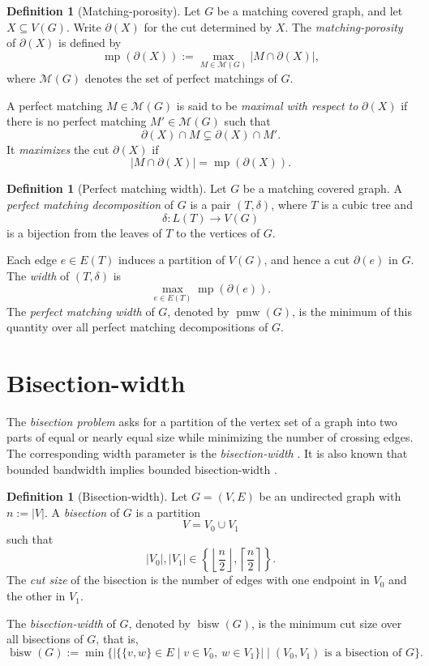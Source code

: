 \documentclass[10pt]{book}
\theoremstyle{definition}
\newtheorem{definition}[theorem]{Definition}
\begin{document}
\begin{definition}[Matching-porosity]
\cite{366}
Let \(G\) be a matching covered graph, and let \(X\subseteq V(G)\).  
Write \(\partial(X)\) for the cut determined by \(X\).  
The \emph{matching-porosity} of \(\partial(X)\) is defined by
\[
\operatorname{mp}(\partial(X))
:=\max_{M\in \mathcal{M}(G)} |M\cap \partial(X)|,
\]
where \(\mathcal{M}(G)\) denotes the set of perfect matchings of \(G\).

A perfect matching \(M\in\mathcal{M}(G)\) is said to be \emph{maximal with respect to} \(\partial(X)\) if there is no perfect matching \(M'\in\mathcal{M}(G)\) such that
\[
\partial(X)\cap M \subsetneq \partial(X)\cap M'.
\]
It \emph{maximizes} the cut \(\partial(X)\) if
\[
|M\cap \partial(X)|=\operatorname{mp}(\partial(X)).
\]
\end{definition}

\begin{definition}[Perfect matching width]
\cite{366}
Let \(G\) be a matching covered graph.  
A \emph{perfect matching decomposition} of \(G\) is a pair \((T,\delta)\), where \(T\) is a cubic tree and
\[
\delta:L(T)\to V(G)
\]
is a bijection from the leaves of \(T\) to the vertices of \(G\).

Each edge \(e\in E(T)\) induces a partition of \(V(G)\), and hence a cut \(\partial(e)\) in \(G\).  
The \emph{width} of \((T,\delta)\) is
\[
\max_{e\in E(T)} \operatorname{mp}(\partial(e)).
\]
The \emph{perfect matching width} of \(G\), denoted by \(\operatorname{pmw}(G)\), is the minimum of this quantity over all perfect matching decompositions of \(G\).
\end{definition}

\section{Bisection-width}
The \emph{bisection problem} asks for a partition of the vertex set of a graph into two parts of equal or nearly equal size while minimizing the number of crossing edges.  
The corresponding width parameter is the \emph{bisection-width} \cite{151,152,bezrukov2004new}.  
It is also known that bounded bandwidth implies bounded bisection-width \cite{341}.

\begin{definition}[Bisection-width]
\cite{bezrukov2004new}
Let \(G=(V,E)\) be an undirected graph with \(n:=|V|\).  
A \emph{bisection} of \(G\) is a partition
\[
V=V_0\cup V_1
\]
such that
\[
|V_0|,|V_1|\in \left\{\left\lfloor \frac{n}{2}\right\rfloor,\left\lceil \frac{n}{2}\right\rceil\right\}.
\]
The \emph{cut size} of the bisection is the number of edges with one endpoint in \(V_0\) and the other in \(V_1\).

The \emph{bisection-width} of \(G\), denoted by \(\operatorname{bisw}(G)\), is the minimum cut size over all bisections of \(G\), that is,
\[
\operatorname{bisw}(G)
:=
\min \bigl\{
|\{\{v,w\}\in E \mid v\in V_0,\ w\in V_1\}|
\;\big|\;
(V_0,V_1)\text{ is a bisection of }G
\bigr\}.
\]
\end{definition}
\end{document}
